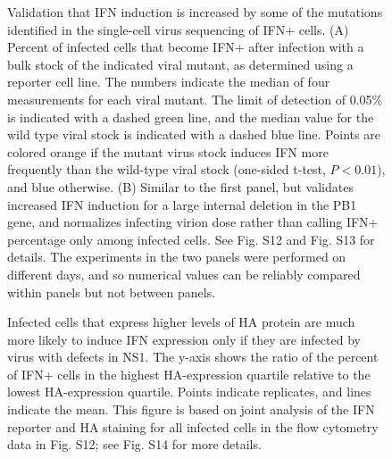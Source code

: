 \documentclass[]{article}
\begin{document}
\begin{figure}
\caption{
Validation that IFN induction is increased by some of the mutations identified in the single-cell virus sequencing of IFN+ cells.
(A)
Percent of infected cells that become IFN+ after infection with a bulk stock of the indicated viral mutant, as determined using a reporter cell line.
The numbers indicate the median of four measurements for each viral mutant.
The limit of detection of 0.05\% is indicated with a dashed green line, and the median value for the wild type viral stock is indicated with a dashed blue line.
Points are colored orange if the mutant virus stock induces IFN more frequently than the wild-type viral stock (one-sided t-test, $P < 0.01$), and blue otherwise.
(B)
Similar to the first panel, but validates increased IFN induction for a large internal deletion in the PB1 gene, and normalizes infecting virion dose rather than calling IFN+ percentage only among infected cells.
See Fig. S12 and Fig. S13 for details.
The experiments in the two panels were performed on different days, and so numerical values can be reliably compared within panels but not between panels.
}
\end{figure}

\begin{figure}
\caption{
Infected cells that express higher levels of HA protein are much more likely to induce IFN expression only if they are infected by virus with defects in NS1.
The y-axis shows the ratio of the percent of IFN+ cells in the highest HA-expression quartile relative to the lowest HA-expression quartile.
Points indicate replicates, and lines indicate the mean.
This figure is based on joint analysis of the IFN reporter and HA staining for all infected cells in the flow cytometry data in Fig. S12; see Fig. S14 for more details.
}
\end{figure}
\end{document}
